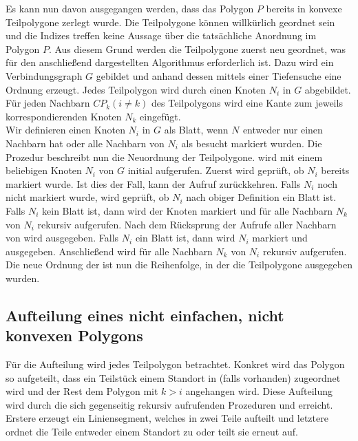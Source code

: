 \documentclass[ngerman]{seminarbeitrag}
\begin{document}
Es kann nun davon ausgegangen werden, dass das Polygon $P$ bereits in konvexe Teilpolygone \cpp zerlegt wurde. Die Teilpolygone können willkürlich geordnet sein und die Indizes treffen keine Aussage über die tatsächliche Anordnung im Polygon $P$. Aus diesem Grund werden die Teilpolygone zuerst neu geordnet, was für den anschließend dargestellten Algorithmus erforderlich ist. Dazu wird ein Verbindungsgraph $G$ gebildet und anhand dessen mittels einer Tiefensuche eine Ordnung erzeugt. Jedes Teilpolygon \cpi wird durch einen Knoten $N_{i}$ in $G$ abgebildet. Für jeden Nachbarn $CP_{k} (i \ne k)$ des Teilpolygons \cpi wird eine Kante zum jeweils korrespondierenden Knoten $N_{k}$ eingefügt. \\
Wir definieren einen Knoten $N_{i}$ in $G$ als Blatt, wenn $N_{}$ entweder nur einen Nachbarn hat oder alle Nachbarn von $N_{i}$ als besucht markiert wurden.
Die Prozedur \ord beschreibt nun die Neuordnung der Teilpolygone. \ord wird mit einem beliebigen Knoten $N_{i}$ von $G$ initial aufgerufen. Zuerst wird geprüft, ob $N_{i}$ bereits markiert wurde. Ist dies der Fall, kann der Aufruf zurückkehren. Falls $N_{i}$ noch nicht markiert wurde, wird geprüft, ob $N_{i}$ nach obiger Definition ein Blatt ist. Falls $N_{i}$ kein Blatt ist, dann wird der Knoten markiert und für alle Nachbarn $N_{k}$ von $N_{i}$ rekursiv \ord aufgerufen. Nach dem Rücksprung der Aufrufe aller Nachbarn von \cpi wird \cpi ausgegeben. Falls $N_{i}$ ein Blatt ist, dann wird $N_{i}$ markiert und \cpi ausgegeben. Anschließend wird für alle Nachbarn $N_{k}$ von $N_{i}$ rekursiv \ord aufgerufen.
Die neue Ordnung der \cpi ist nun die Reihenfolge, in der die Teilpolygone ausgegeben wurden.

\subsection{Aufteilung eines nicht einfachen, nicht konvexen Polygons}\label{aufteilung nicht konvex}
Für die Aufteilung wird jedes Teilpolygon \cpp betrachtet. Konkret wird das Polygon \pred{\mcpi} so aufgeteilt, dass ein Teilstück einem Standort in \cpi (falls vorhanden) zugeordnet wird und der Rest dem Polygon  mit $k > i$ angehangen wird. Diese Aufteilung wird durch die sich gegenseitig rekursiv aufrufenden Prozeduren \noncon und \daa erreicht. Erstere erzeugt ein Liniensegment, welches \pred{\mcpi} in zwei Teile aufteilt und letztere ordnet die Teile entweder einem Standort zu oder teilt sie erneut auf.
\end{document}
